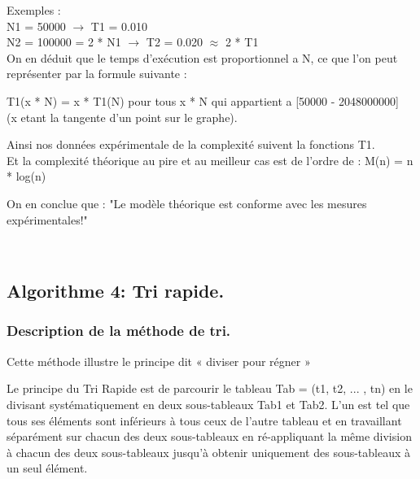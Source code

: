 \documentclass[12pt]{article}
\begin{document}
Exemples :\\
N1 = 50000 $\rightarrow$ T1 = 0.010 \\
N2 = 100000 = 2 * N1 $\rightarrow$ T2 = 0.020 $\approx$ 2 * T1\\

On en déduit que le temps d'exécution est proportionnel a N, ce que l'on peut représenter par la formule suivante :\\

\begin{center}

\color{red}
T1(x * N) = x * T1(N) pour tous x * N qui appartient a [50000 - 2048000000]\\
\color{black}
(x etant la tangente d'un point sur le graphe).\\

\end{center}

Ainsi nos données expérimentale de la complexité suivent la fonctions T1. \\ 
Et la complexité théorique au pire et au meilleur cas est de l'ordre de : M(n) = n * log(n)\\

\begin{center}

  On en conclue que :
\color{red}
 "Le modèle théorique est conforme avec les mesures expérimentales!"\\
\color{black}
\end{center}
\texttt{  }

\newpage



\subsection{Algorithme 4: Tri rapide.}
\subsubsection{Description de la méthode de tri.}
 Cette méthode illustre le principe dit « diviser pour régner »
 
Le principe du Tri Rapide est de parcourir le tableau Tab = (t1, t2, ... , tn) en le divisant systématiquement en deux sous-tableaux Tab1 et Tab2.
 L'un est tel que tous ses éléments sont inférieurs à tous ceux de l'autre tableau et en travaillant séparément sur chacun des deux sous-tableaux
 en ré-appliquant la même division à chacun des deux sous-tableaux jusqu'à obtenir uniquement des sous-tableaux à un seul élément.
\end{document}
